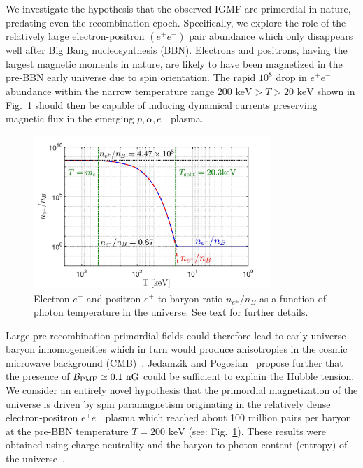 \documentclass[a4paper]{article}
\newcommand*{\keV}{\text{ keV}}
\newcommand{\rf}[1]{Fig.~{\ref{#1}}}
\newcommand*{\xblue}{\color{black}}
\begin{document}
We investigate the hypothesis that the observed  IGMF  are primordial in nature, predating even the recombination epoch. Specifically, we explore the role of the relatively large electron-positron $(e^{+}e^{-})$ pair abundance which only disappears well after Big Bang nucleosynthesis (BBN). {\xblue Electrons and positrons, having the largest magnetic moments in nature, are likely to have been magnetized in the pre-BBN early universe due to spin orientation. The rapid $10^{8}$ drop in $e^{+}e^{-}$ abundance within the narrow temperature range $200\keV>T>20\keV$ shown in \rf{fig:densityratio} should then be capable of inducing dynamical currents preserving magnetic flux} in the emerging $p,\alpha,e^-$ plasma.  
\begin{figure}[ht]
    \centering
    \includegraphics[width=0.8\textwidth]{plots/EEPlasmaDensityRatio_new.jpg}
    \caption{Electron $e^-$ and positron $e^+$ to baryon ratio $n_{e^{\pm}}/n_{B}$  as a function of photon temperature in the universe. See text for further details.}
    \label{fig:densityratio} 
\end{figure}

Large pre-recombination primordial fields could therefore lead to early universe baryon inhomogeneities which in turn would produce anisotropies in the cosmic microwave background (CMB)~\cite{jedamzik2013smallscale,abdalla2022cosmology}. Jedamzik and Pogosian~\cite{jedamzik2020relieving} propose further that the presence of ${\cal B}_{\rm PMF}\simeq0.1{\rm\ nG}$ could be sufficient to explain the Hubble tension. {\xblue We consider an entirely novel hypothesis that the primordial magnetization of the universe is driven by spin paramagnetism originating in the relatively dense electron-positron $e^{+}e^{-}$ plasma which reached about 100 million pairs per baryon at the pre-BBN temperature $T=200\keV$ (see: \rf{fig:densityratio}). These results were obtained using charge neutrality and the baryon to photon content (entropy) of the universe~\cite{rafelski2023short}.} 
\end{document}
